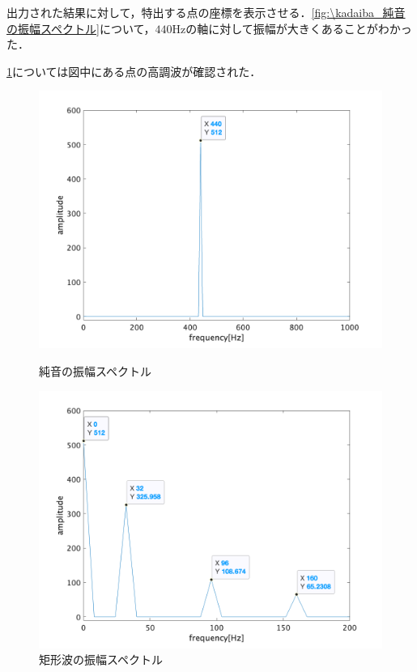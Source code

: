\result
出力された結果に対して，特出する点の座標を表示させる．\ref{fig:\kadaiba_純音の振幅スペクトル}について，\(440\textrm{Hz}\)の軸に対して振幅が大きくあることがわかった．\par
\ref{fig:\kadaiba_矩形波の振幅スペクトル}については図中にある点の高調波が確認された．
\begin{figure}[h]
    \centering
    \begin{minipage}{.48\textwidth}
        \centering
        \includegraphics[keepaspectratio,width=\textwidth]{../../Figures/02_01.png}
        \caption{純音の振幅スペクトル}
        \label{fig:\kadaiba_純音の振幅スペクトル}
    \end{minipage}
    \begin{minipage}{.48\textwidth}
        \centering
        \includegraphics[keepaspectratio,width=\textwidth]{../../Figures/02_022.png}
        \caption{矩形波の振幅スペクトル}
        \label{fig:\kadaiba_矩形波の振幅スペクトル}
    \end{minipage}
\end{figure}
\consideration
